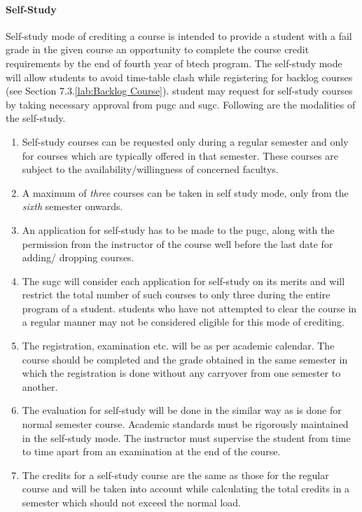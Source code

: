 \paragraph{Self-Study} Self-study mode of crediting a course is intended to provide a \gls{student} with a fail grade in the given course an opportunity to complete the course credit requirements by the end of fourth year of \acrshort{btech} program. The self-study mode will allow \glspl{student} to avoid time-table clash while registering for backlog courses (see Section 7.3.\ref{lab:Backlog Course}). \Gls{student} may request for self-study courses by taking necessary approval from \acrshort{pugc} and \acrshort{sugc}. Following are the modalities of the self-study.

\begin{enumerate} [leftmargin=15mm]
    \item Self-study courses can be requested only during a regular semester and only for courses which are typically offered in that semester. These courses are subject to the availability/willingness of concerned \glspl{faculty}.
    \item A maximum of \textit{three} courses can be taken in self study mode, only from the \textit{sixth} semester onwards.
    \item An application for self-study has to be made to the \acrshort{pugc}, along with the permission from the instructor of the course well before the last date for adding/ dropping courses. 
    \item The \acrshort{sugc} will consider each application for self-study on its merits and will restrict the total number of such courses to only three during the entire program of a \gls{student}. \Glspl{student} who have not attempted to clear the course in a regular manner may not be considered eligible for this mode of crediting. 
    \item The registration, examination etc. will be as per academic calendar. The course should be completed and the grade obtained in the same semester in which the registration is done without any carryover from one semester to another. 
    \item The evaluation for self-study will be done in the similar way as is done for normal semester course. Academic standards must be rigorously maintained in the self-study mode. The instructor must supervise the \gls{student} from time to time apart from an examination at the end of the course.
    \item The credits for a self-study course are the same as those for the regular course and will be taken into account while calculating the total credits in a semester which should not exceed the normal load. 
\end{enumerate}

